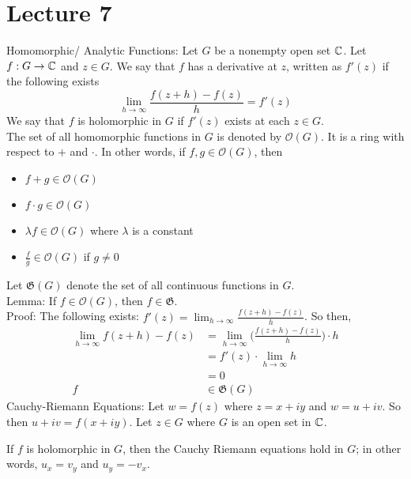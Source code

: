 \documentclass[12pt]{article}
\begin{document}
\section{Lecture 7} 
Homomorphic/ Analytic Functions: Let $G$ be a nonempty open set $\mathbb{C}$. Let $f: G \to \mathbb{C}$ and $z \in G$. We say that $f$ has a derivative at $z$, written as $f'(z)$ if the following exists $$ \lim_{h\to\infty} \frac{f(z+h) - f(z)}{h} = f'(z)$$ 
We say that $f$ is holomorphic in $G$ if $f'(z)$ exists at each $z \in G$. \\ 
The set of all homomorphic functions in $G$ is denoted by $\mathcal{O}(G)$. It is a ring with respect to $+$ and $\cdot$. In other words, if $f, g \in \mathcal{O}(G)$, then \begin{itemize} 
\item $f+g \in \mathcal{O}(G)$ 
\item $f \cdot g \in \mathcal{O}(G)$
\item $\lambda f \in \mathcal{O}(G)$ where $\lambda$ is a constant 
\item $\frac{f}{g} \in \mathcal{O}(G)$ if $g \neq 0$ \end{itemize} 
Let $\mathfrak{G}(G)$ denote the set of all continuous functions in $G$. \\
Lemma: If $f \in \mathcal{O}(G)$, then $f \in \mathfrak{G}$. \\ 
Proof: The following exists: $f'(z) = \lim_{h\to\infty} \frac{f(z+h) - f(z)}{h}$. So then, $$ \begin{aligned} \lim_{h\to\infty} f(z+h) - f(z) &= \lim_{h\to\infty} \Big( \frac{f(z+h) - f(z)}{h} \Big) \cdot h \\ &= f'(z) \cdot \lim_{h\to\infty} h \\ &= 0 \\ f &\in \mathfrak{G}(G) \end{aligned} $$ 
Cauchy-Riemann Equations: Let $w = f(z)$ where $z = x + iy$ and $w = u + iv$. So then $u + iv = f(x + iy)$. Let $z \in G$ where $G$ is an open set in $\mathbb{C}$. 
\begin{theorem} If $f$ is holomorphic in $G$, then the Cauchy Riemann equations hold in $G$; in other words, $u_x = v_y$ and $u_y = -v_x$. \end{theorem} 
\end{document}

